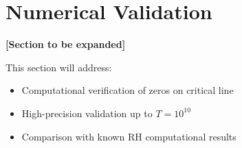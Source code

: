 \section{Numerical Validation}
\label{sec:numerics}

\textbf{[Section to be expanded]}

This section will address:
\begin{itemize}
\item Computational verification of zeros on critical line
\item High-precision validation up to $T = 10^{10}$
\item Comparison with known RH computational results
\end{itemize}
